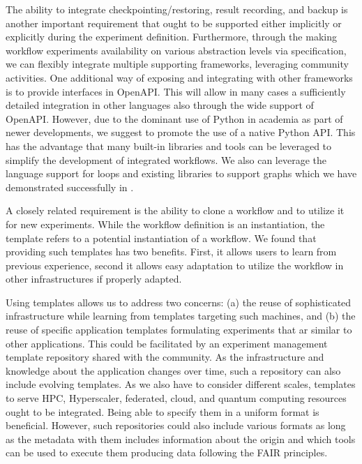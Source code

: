 \documentclass[sigconf]{acmart}
\begin{document}
The ability to integrate checkpointing/restoring, result recording, and backup is another important requirement that ought to be supported either implicitly or explicitly during the experiment definition. Furthermore, through the making workflow experiments availability  on various abstraction levels via specification, we can flexibly integrate multiple supporting frameworks, leveraging community activities.  One additional way of exposing and integrating with other frameworks is to provide interfaces in OpenAPI. This will allow in many cases a sufficiently detailed integration in other languages also through the wide support of OpenAPI. However, due to the dominant use of Python in academia as part of newer developments, we suggest to promote the use of a native Python API. This has the advantage that many built-in libraries and tools can be leveraged to simplify the development of integrated workflows. We also can leverage the language support for loops and existing libraries to support graphs which we have demonstrated successfully in \citep{cloudmesh-cc}.

 A closely related requirement is the ability to clone a workflow and to utilize it for new experiments. While the workflow definition is an instantiation, the template refers to a potential instantiation of a workflow. We found that providing such templates has two benefits. First, it allows users to learn from previous experience, second it allows easy adaptation to utilize the workflow in other infrastructures if properly adapted. 

 Using templates allows us to address two concerns: (a) the reuse of sophisticated infrastructure while learning from templates targeting such machines, and (b) the reuse of specific application templates formulating experiments that ar similar to other applications. This could be facilitated by an experiment management template repository shared with the community. As the infrastructure and knowledge about the application changes over time, such a repository can also include evolving templates. As we also have to consider different scales, templates to serve HPC, Hyperscaler, federated, cloud, and quantum computing \citep{bieberich2023} resources ought to be integrated. Being able to specify them in a uniform format is beneficial. However, such repositories could also include various formats as long as the metadata with them includes information about the origin and which tools can be used to execute them producing data following the FAIR \citep{wilkinson2016fair} principles.
\end{document}
